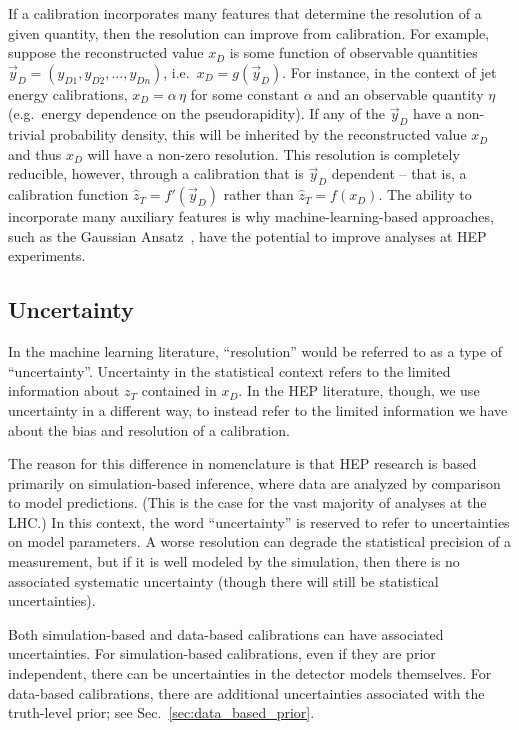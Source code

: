 \documentclass[aps,prd,reprint,preprintnumbers,superscriptaddress,nofootinbib,longbibliography,floatfix]{revtex4-1}
\DeclareRobustCommand{\Sec}[1]{Sec.~\ref{sec:#1}}
\begin{document}
 
 If a calibration incorporates many features that determine the resolution of a given quantity, then the resolution can improve from calibration.
 For example, suppose the reconstructed value $x_D$ is some function of observable quantities $\Vec{y}_D = (y_{D1}, y_{D2}, ..., y_{Dn})$, i.e.\ $x_D = g(\Vec{y}_D)$.
 For instance, in the context of jet energy calibrations, $x_D = \alpha \, \eta$ for some constant $\alpha$ and an observable quantity $\eta$ (e.g.\ energy dependence on the pseudorapidity).
 If any of the $\Vec{y}_D$ have a non-trivial probability density, this will be inherited by the reconstructed value $x_D$ and thus $x_D$ will have a non-zero resolution.
 This resolution is completely reducible, however, through a calibration that is $\Vec{y}_D$ dependent -- that is, a calibration function $\hat{z}_T = f'(\Vec{y}_D)$ rather than $\hat{z}_T = f(x_D)$.
 The ability to incorporate many auxiliary features is why machine-learning-based approaches, such as the Gaussian Ansatz~\cite{frequentstway}, have the potential to improve analyses at HEP experiments.


\subsection{Uncertainty}
\label{sec:uncert}

In the machine learning literature, ``resolution'' would be referred to as a type of ``uncertainty''.
%
Uncertainty in the statistical context refers to the limited information about $z_T$ contained in $x_D$.
%
In the HEP literature, though, we use uncertainty in a different way, to instead refer to the limited information we have about the bias and resolution of a calibration.


The reason for this difference in nomenclature is that HEP research is based primarily on simulation-based inference, where data are analyzed by comparison to model predictions.
%
(This is the case for the vast majority of analyses at the LHC.)
%
In this context, the word ``uncertainty'' is reserved to refer to uncertainties on model parameters. 
%
A worse resolution can degrade the statistical precision of a measurement, but if it is well modeled by the simulation, then there is no associated systematic uncertainty (though there will still be statistical uncertainties).


Both simulation-based and data-based calibrations can have associated uncertainties.
%
For simulation-based calibrations, even if they are prior independent, there can be uncertainties in the detector models themselves.
%
For data-based calibrations, there are additional uncertainties associated with the truth-level prior; see \Sec{data_based_prior}.
\end{document}
